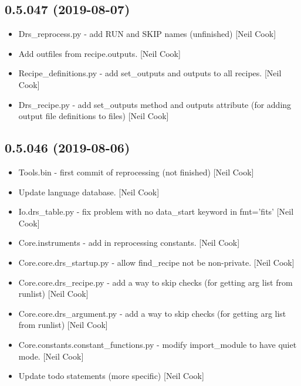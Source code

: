 \documentclass[a4paper,10pt,english]{report}
\begin{document}
\subsection{0.5.047 (2019-08-07)}
\label{\detokenize{misc/changelog:id94}}\begin{itemize}
\item {} 
Drs\_reprocess.py - add RUN and SKIP names (unfinished) {[}Neil Cook{]}

\item {} 
Add outfiles from recipe.outputs. {[}Neil Cook{]}

\item {} 
Recipe\_definitions.py - add set\_outputs and outputs to all recipes.
{[}Neil Cook{]}

\item {} 
Drs\_recipe.py - add set\_outputs method and outputs attribute (for
adding output file definitions to files) {[}Neil Cook{]}

\end{itemize}


\subsection{0.5.046 (2019-08-06)}
\label{\detokenize{misc/changelog:id95}}\begin{itemize}
\item {} 
Tools.bin - first commit of reprocessing (not finished) {[}Neil Cook{]}

\item {} 
Update language database. {[}Neil Cook{]}

\item {} 
Io.drs\_table.py - fix problem with no data\_start keyword in fmt=’fits’
{[}Neil Cook{]}

\item {} 
Core.instruments - add in reprocessing constants. {[}Neil Cook{]}

\item {} 
Core.core.drs\_startup.py - allow find\_recipe not be non-private. {[}Neil
Cook{]}

\item {} 
Core.core.drs\_recipe.py - add a way to skip checks (for getting arg
list from runlist) {[}Neil Cook{]}

\item {} 
Core.core.drs\_argument.py - add a way to skip checks (for getting arg
list from runlist) {[}Neil Cook{]}

\item {} 
Core.constants.constant\_functions.py - modify import\_module to have
quiet mode. {[}Neil Cook{]}

\item {} 
Update todo statements (more specific) {[}Neil Cook{]}

\end{itemize}
\end{document}
